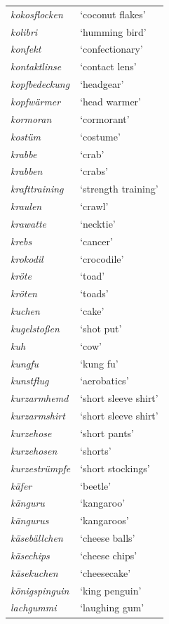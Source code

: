 \begin{longtable}{ll}
\textit{kokosflocken} & `coconut flakes' \\
\textit{kolibri} & `humming bird' \\
\textit{konfekt} & `confectionary' \\
\textit{kontaktlinse} & `contact lens' \\
\textit{kopfbedeckung} & `headgear' \\
\textit{kopfwärmer} & `head warmer' \\
\textit{kormoran} & `cormorant' \\
\textit{kostüm} & `costume' \\
\textit{krabbe} & `crab' \\
\textit{krabben} & `crabs' \\
\textit{krafttraining} & `strength training' \\
\textit{kraulen} & `crawl' \\
\textit{krawatte} & `necktie' \\
\textit{krebs} & `cancer' \\
\textit{krokodil} & `crocodile' \\
\textit{kröte} & `toad' \\
\textit{kröten} & `toads' \\
\textit{kuchen} & `cake' \\
\textit{kugelstoßen} & `shot put' \\
\textit{kuh} & `cow' \\
\textit{kungfu} & `kung fu' \\
\textit{kunstflug} & `aerobatics' \\
\textit{kurzarmhemd} & `short sleeve shirt' \\
\textit{kurzarmshirt} & `short sleeve shirt' \\
\textit{kurzehose} & `short pants' \\
\textit{kurzehosen} & `shorts' \\
\textit{kurzestrümpfe} & `short stockings' \\
\textit{käfer} & `beetle' \\
\textit{känguru} & `kangaroo' \\
\textit{kängurus} & `kangaroos' \\
\textit{käsebällchen} & `cheese balls' \\
\textit{käsechips} & `cheese chips' \\
\textit{käsekuchen} & `cheesecake' \\
\textit{königspinguin} & `king penguin' \\
\textit{lachgummi} & `laughing gum' \\

\end{longtable}
